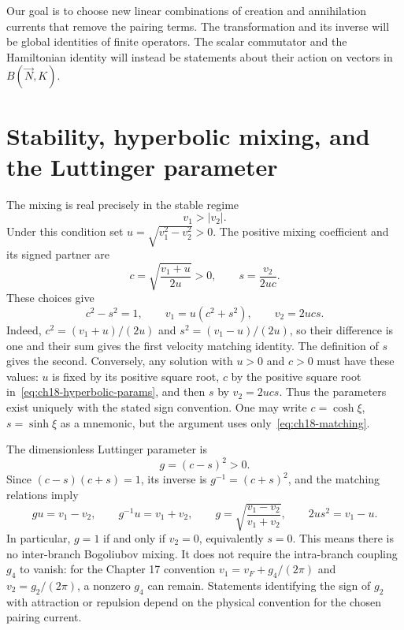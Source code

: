 Our goal is to choose new linear combinations of creation and annihilation currents that remove the pairing terms. The transformation and its inverse will be global identities of finite operators. The scalar commutator and the Hamiltonian identity will instead be statements about their action on vectors in $B(\vec N,K)$.

\section{Stability, hyperbolic mixing, and the Luttinger parameter}

The mixing is real precisely in the stable regime
\begin{equation}
  v_1>|v_2|.
  \label{eq:ch18-stability}
\end{equation}
Under this condition set $u=\sqrt{v_1^2-v_2^2}>0$. The positive mixing coefficient and its signed partner are
\begin{equation}
  c=\sqrt{\frac{v_1+u}{2u}}>0,
  \qquad s=\frac{v_2}{2uc}.
  \label{eq:ch18-hyperbolic-params}
\end{equation}
These choices give
\begin{equation}
  c^2-s^2=1,\qquad v_1=u(c^2+s^2),\qquad v_2=2ucs.
  \label{eq:ch18-matching}
\end{equation}
\label{thm:hyperbolic_params_exist}
Indeed, $c^2=(v_1+u)/(2u)$ and $s^2=(v_1-u)/(2u)$, so their difference is one and their sum gives the first velocity matching identity. The definition of $s$ gives the second. Conversely, any solution with $u>0$ and $c>0$ must have these values: $u$ is fixed by its positive square root, $c$ by the positive square root in~\eqref{eq:ch18-hyperbolic-params}, and then $s$ by $v_2=2ucs$. Thus the parameters exist uniquely with the stated sign convention. One may write $c=\cosh\xi$, $s=\sinh\xi$ as a mnemonic, but the argument uses only~\eqref{eq:ch18-matching}.

The dimensionless Luttinger parameter is
\begin{equation}
  g=(c-s)^2>0.
  \label{eq:ch18-g}
\end{equation}
Since $(c-s)(c+s)=1$, its inverse is $g^{-1}=(c+s)^2$, and the matching relations imply
\begin{equation}
  gu=v_1-v_2,\qquad g^{-1}u=v_1+v_2,
  \qquad g=\sqrt{\frac{v_1-v_2}{v_1+v_2}},
  \qquad 2us^2=v_1-u.
  \label{eq:ch18-useful-invariants}
\end{equation}
\label{prop:luttinger_invariants}
In particular, $g=1$ if and only if $v_2=0$, equivalently $s=0$. This means there is no inter-branch Bogoliubov mixing. It does not require the intra-branch coupling $g_4$ to vanish: for the Chapter 17 convention $v_1=v_F+g_4/(2\pi)$ and $v_2=g_2/(2\pi)$, a nonzero $g_4$ can remain. Statements identifying the sign of $g_2$ with attraction or repulsion depend on the physical convention for the chosen pairing current.

